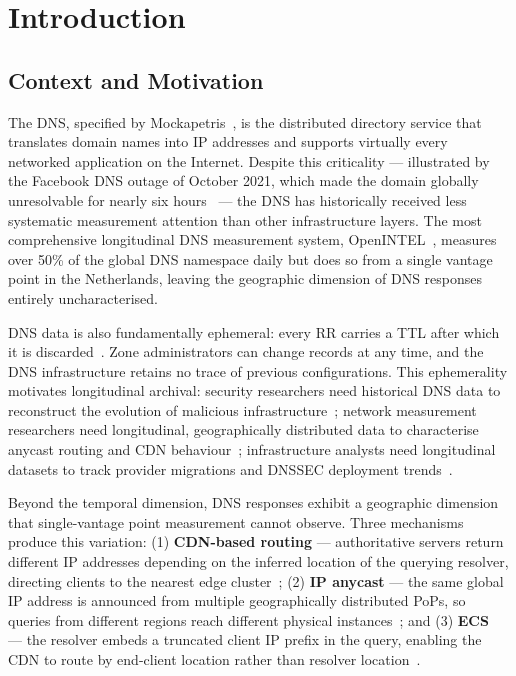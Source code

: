 \chapter{Introduction}
\label{ch:introduction}

\section{Context and Motivation}
\label{sec:1.1}

The \ac{DNS}, specified by Mockapetris~\cite{RFC1034,RFC1035}, is the distributed directory service that translates domain names into \ac{IP} addresses and supports virtually every networked application on the Internet. Despite this criticality — illustrated by the Facebook \ac{DNS} outage of October 2021, which made the domain globally unresolvable for nearly six hours~\cite{Xu2023} — the \ac{DNS} has historically received less systematic measurement attention than other infrastructure layers. The most comprehensive longitudinal \ac{DNS} measurement system, OpenINTEL~\cite{vanRijswijk2016}, measures over 50\% of the global \ac{DNS} namespace daily but does so from a single vantage point in the Netherlands, leaving the geographic dimension of \ac{DNS} responses entirely uncharacterised.

\ac{DNS} data is also fundamentally ephemeral: every \ac{RR} carries a \ac{TTL} after which it is discarded~\cite{RFC1034,RFC1035}. Zone administrators can change records at any time, and the \ac{DNS} infrastructure retains no trace of previous configurations. This ephemerality motivates longitudinal archival: security researchers need historical \ac{DNS} data to reconstruct the evolution of malicious infrastructure~\cite{vanderToorn2018}; network measurement researchers need longitudinal,
geographically distributed data to characterise anycast routing and \ac{CDN} behaviour~\cite{Bortzmeyer2013,Hours2016}; infrastructure analysts need longitudinal datasets to track provider migrations and \ac{DNSSEC} deployment trends~\cite{vanRijswijk2016}.

Beyond the temporal dimension, \ac{DNS} responses exhibit a geographic dimension that single-vantage point measurement cannot observe. Three mechanisms produce this variation: (1) \textbf{\ac{CDN}-based routing} — authoritative servers return different \ac{IP} addresses depending on the inferred location of the querying resolver, directing clients to the nearest edge cluster~\cite{Li2025,Hours2016}; (2) \textbf{\ac{IP} anycast} — the same global \ac{IP} address is announced from multiple geographically distributed \ac{PoPs}, so queries from different regions reach different physical instances~\cite{Bortzmeyer2013,Koch2021}; and (3) \textbf{\ac{ECS}}~\cite{RFC7871} — the resolver embeds a truncated client \ac{IP} prefix in the query, enabling the \ac{CDN} to route by end-client location rather than resolver location~\cite{Wang2018}. 

